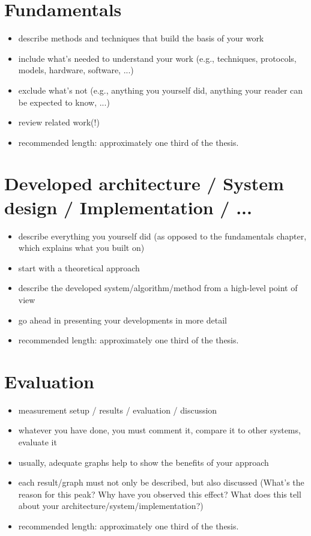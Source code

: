 \documentclass[]{nsm-thesis}
\begin{document}
\chapter{Fundamentals}
\label{sec:fundamentals}


\begin{itemize}
\item describe methods and techniques that build the basis of your work
\item include what's needed to understand your work (e.g., techniques, protocols, models, hardware, software, ...)
\item exclude what's not (e.g., anything you yourself did, anything your reader can be expected to know, ...)
\item review related work(!)
\item recommended length: approximately one third of the thesis.
\end{itemize}


\chapter{Developed architecture / System design / Implementation / ...}


\begin{itemize}
\item describe everything you yourself did (as opposed to the fundamentals chapter, which explains what you built on)
\item start with a theoretical approach
\item describe the developed system/algorithm/method from a high-level point of view
\item go ahead in presenting your developments in more detail
\item recommended length: approximately one third of the thesis.
\end{itemize}



\chapter{Evaluation}


\begin{itemize}
\item measurement setup / results / evaluation / discussion
\item whatever you have done, you must comment it, compare it to other systems, evaluate it
\item usually, adequate graphs help to show the benefits of your approach
\item each result/graph must not only be described, but also discussed (What's the reason for this peak? Why have you observed this effect? What does this tell about your architecture/system/implementation?)
\item recommended length: approximately one third of the thesis.
\end{itemize}
\end{document}
